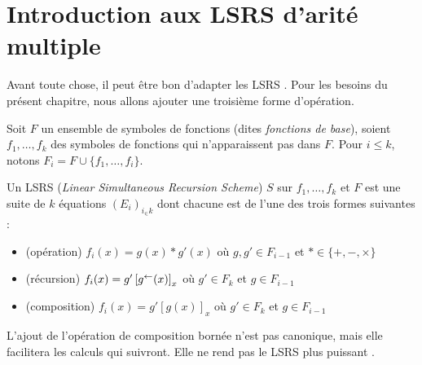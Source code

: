 		
	
	
	\section{Introduction aux LSRS d'arité multiple}
	\label{sec:rintroduction}
	
		Avant toute chose, il peut être bon d'adapter les LSRS \cite{Schwentick1997} \cite{GrandjeanSchwentick2002}. Pour les besoins du présent chapitre, nous allons ajouter une troisième forme d'opération.
		
		
		\begin{definition}[LSRS]
			\label{def:LSRS_2}
			Soit $F$ un ensemble de symboles de fonctions (dites \emph{fonctions de base}), soient $f_1, \dots, f_k$ des symboles de fonctions qui n'apparaissent pas dans $F$. Pour $i\leqslant k$, notons $F_i = F\cup \{f_1, \dots, f_i\}$. 
		
			Un LSRS (\emph{Linear Simultaneous Recursion Scheme}) $S$ sur $f_1, \dots, f_k$ et $F$ est une suite de $k$ équations $\left(E_i\right)_{i_\in k}$ dont chacune est de l'une des trois formes suivantes :
			
			\begin{itemize}[itemsep=-1mm]
				\item 	(opération) 		$f_i(x) = g(x) * g'(x)$ où $g,g' \in F_{i-1}$ et $* \in \{+, -, \times \}$ %
				
				
				\item 	(récursion)			$f_i(x) = g'\left[ g^{\leftarrow}(x) \right]_{x}$ où $g' \in F_k$ et $g \in F_{i-1}$			
				
				\item 	(composition)			$f_i(x) = g'\left[g(x)\right]_x$ où $g' \in F_k$ et $g \in F_{i-1}$
			\end{itemize}
		\end{definition}
		
		\begin{remark}
			L'ajout de l'opération de composition bornée n'est pas canonique, mais elle facilitera les calculs qui suivront. Elle ne rend pas le LSRS plus puissant \cite{GrandjeanSchwentick2002}.
		\end{remark}
		
